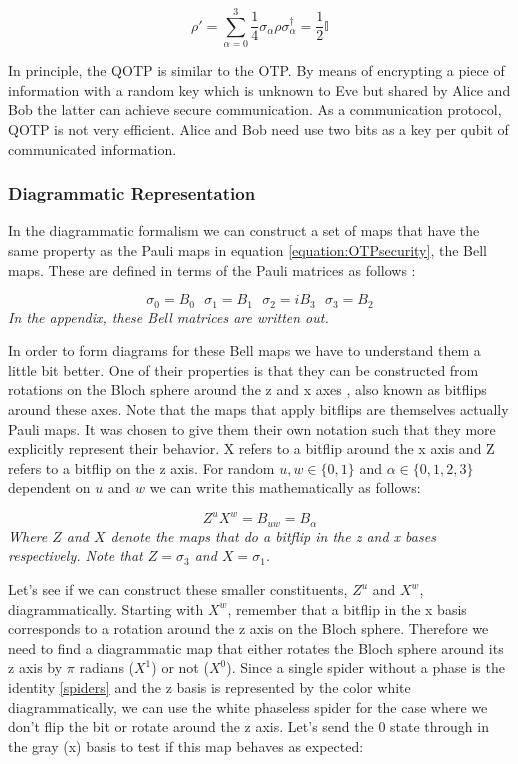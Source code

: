 \documentclass[]{article}
\begin{document}
\begin{equation}
	\label{equation:OTPsecurity}
	\rho' = \sum\limits_{\alpha = 0}^3 \frac{1}{4} \sigma_\alpha \rho \sigma_\alpha^\dagger = \frac{1}{2}\mathbb{I}
\end{equation}

In principle, the QOTP is similar to the OTP. By means of encrypting a piece of information with a random key which is unknown to Eve but shared by Alice and Bob the latter can achieve secure communication. As a communication protocol, QOTP is not very efficient. Alice and Bob need use two bits as a key per qubit of communicated information.

\subsubsection{Diagrammatic Representation}
\label{DiagramRepresentationQOTP}
In the diagrammatic formalism we can construct a set of maps that have the same property as the Pauli maps in equation \ref{equation:OTPsecurity}, the Bell maps. These are defined in terms of the Pauli matrices as follows \cite{Coecke2017}:

\begin{equation}
	\sigma_0 = B_0 ~~~ \sigma_1 = B_1 ~~~ \sigma_2 = iB_3 ~~~ \sigma_3 = B_2 
\end{equation}
\textit{In the appendix, these Bell matrices are written out.}

In order to form diagrams for these Bell maps we have to understand them a little bit better. One of their properties is that they can be constructed from rotations on the Bloch sphere around the z and x axes \cite{DJORDJEVIC2012227}, also known as bitflips around these axes. Note that the maps that apply bitflips are themselves actually Pauli maps. It was chosen to give them their own notation such that they more explicitly represent their behavior. X refers to a bitflip around the x axis and Z refers to a bitflip on the z axis. For random $u, w \in \{0,1\}$ and $\alpha \in \{0,1,2,3\}$ dependent on $u$ and $w$ we can write this mathematically as follows:

\begin{equation}
\label{randombell}
	Z^uX^w = B_{uw} = B_\alpha
\end{equation}
\textit{Where $Z$ and $X$ denote the maps that do a bitflip in the z and x bases respectively. Note that $Z = \sigma_3$ and $X = \sigma_1$.}

Let's see if we can construct these smaller constituents, $Z^u$ and $X^w$, diagrammatically. Starting with $X^w$, remember that a bitflip in the x basis corresponds to a rotation around the z axis on the Bloch sphere. Therefore we need to find a diagrammatic map that either rotates the Bloch sphere around its z axis by $\pi$ radians ($X^1$) or not ($X^0$). Since a single spider without a phase is the identity \ref{spiders} and the z basis is represented by the color white diagrammatically, we can use the white phaseless spider for the case where we don't flip the bit or rotate around the z axis. Let's send the 0 state through in the gray (x) basis to test if this map behaves as expected:
\end{document}
